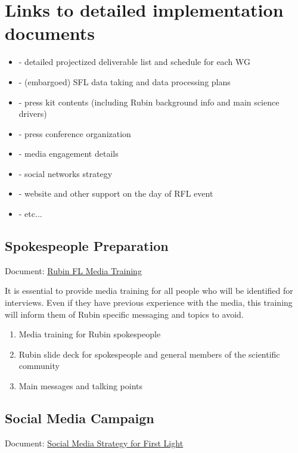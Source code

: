 \section{Links to detailed implementation documents} \label{sec:links}

\begin{itemize}
\item - detailed projectized deliverable list and schedule for each WG
\item - (embargoed) SFL data taking and data processing plans
\item - press kit contents (including Rubin background info and main science drivers)
\item - press conference organization
\item - media engagement details
\item - social networks strategy
\item - website and other support on the day of RFL event
\item - etc...
\end{itemize}


\subsection{Spokespeople Preparation}
Document: \href{https://docs.google.com/document/d/14pbmwzvYFVolCZJV7rvoWdZQHR82a8kKWZrBjAUKzzI/edit}{Rubin FL Media Training }

It is essential to provide media training for all people who will be identified for interviews. Even if they have previous experience with the media, this training will inform them of Rubin specific messaging and topics to avoid.

\begin{enumerate}
\item Media training for Rubin spokespeople
\item Rubin slide deck for spokespeople and general members of the scientific community
\item Main messages and talking points
\end{enumerate}

\subsection{Social Media Campaign}
Document: \href{https://docs.google.com/document/d/1-STd7aO3-_T73zZEHpxTrj2OtYoc_e6QERagPVNbfFQ/edit#heading=h.rkin5k30kjf}{Social Media Strategy for First Light}

